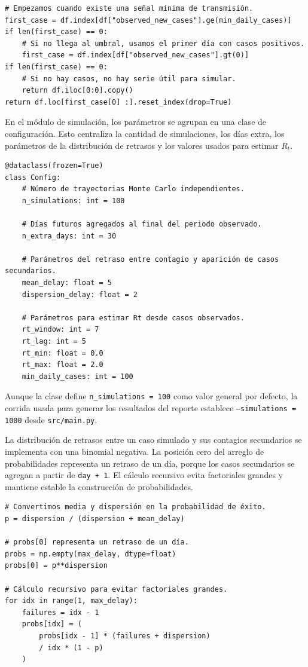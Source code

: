 \documentclass[12pt]{article}
\begin{document}
\begin{lstlisting}[caption={Selección del inicio de la serie simulada.},label={lst:start-date}]
# Empezamos cuando existe una señal mínima de transmisión.
first_case = df.index[df["observed_new_cases"].ge(min_daily_cases)]
if len(first_case) == 0:
    # Si no llega al umbral, usamos el primer día con casos positivos.
    first_case = df.index[df["observed_new_cases"].gt(0)]
if len(first_case) == 0:
    # Si no hay casos, no hay serie útil para simular.
    return df.iloc[0:0].copy()
return df.loc[first_case[0] :].reset_index(drop=True)
\end{lstlisting}

En el módulo de simulación, los parámetros se agrupan en una clase de
configuración. Esto centraliza la cantidad de simulaciones, los días extra, los
parámetros de la distribución de retrasos y los valores usados para estimar
\(R_t\).

\begin{lstlisting}[caption={Parámetros principales de la simulación.},label={lst:config}]
@dataclass(frozen=True)
class Config:
    # Número de trayectorias Monte Carlo independientes.
    n_simulations: int = 100

    # Días futuros agregados al final del periodo observado.
    n_extra_days: int = 30

    # Parámetros del retraso entre contagio y aparición de casos secundarios.
    mean_delay: float = 5
    dispersion_delay: float = 2

    # Parámetros para estimar Rt desde casos observados.
    rt_window: int = 7
    rt_lag: int = 5
    rt_min: float = 0.0
    rt_max: float = 2.0
    min_daily_cases: int = 100
\end{lstlisting}

Aunque la clase define \texttt{n\_simulations = 100} como valor general por
defecto, la corrida usada para generar los resultados del reporte establece
\texttt{--simulations = 1000} desde \texttt{src/main.py}.

La distribución de retrasos entre un caso simulado y sus contagios secundarios
se implementa con una binomial negativa. La posición cero del arreglo de
probabilidades representa un retraso de un día, porque los casos secundarios se
agregan a partir de \texttt{day + 1}. El cálculo recursivo evita factoriales
grandes y mantiene estable la construcción de probabilidades.

\begin{lstlisting}[caption={Probabilidades de retraso con binomial negativa.},label={lst:delay-probs}]
# Convertimos media y dispersión en la probabilidad de éxito.
p = dispersion / (dispersion + mean_delay)

# probs[0] representa un retraso de un día.
probs = np.empty(max_delay, dtype=float)
probs[0] = p**dispersion

# Cálculo recursivo para evitar factoriales grandes.
for idx in range(1, max_delay):
    failures = idx - 1
    probs[idx] = (
        probs[idx - 1] * (failures + dispersion)
        / idx * (1 - p)
    )
\end{lstlisting}
\end{document}
